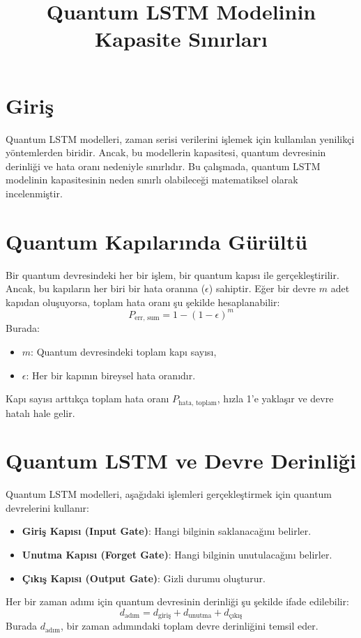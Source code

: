 \documentclass[a4paper,12pt]{article}
\title{Quantum LSTM Modelinin Kapasite Sınırları}
\author{}
\date{}
\begin{document}
\maketitle

\section*{Giriş}
Quantum LSTM modelleri, zaman serisi verilerini işlemek için kullanılan yenilikçi yöntemlerden biridir. Ancak, bu modellerin kapasitesi, quantum devresinin derinliği ve hata oranı nedeniyle sınırlıdır. Bu çalışmada, quantum LSTM modelinin kapasitesinin neden sınırlı olabileceği matematiksel olarak incelenmiştir.

\section*{Quantum Kapılarında Gürültü}
Bir quantum devresindeki her bir işlem, bir quantum kapısı ile gerçekleştirilir. Ancak, bu kapıların her biri bir hata oranına ($\epsilon$) sahiptir. Eğer bir devre $m$ adet kapıdan oluşuyorsa, toplam hata oranı şu şekilde hesaplanabilir:
\[
P_{\text{err, sum}} = 1 - (1 - \epsilon)^m
\]
Burada:
\begin{itemize}
    \item $m$: Quantum devresindeki toplam kapı sayısı,
    \item $\epsilon$: Her bir kapının bireysel hata oranıdır.
\end{itemize}
Kapı sayısı arttıkça toplam hata oranı $P_{\text{hata, toplam}}$, hızla 1'e yaklaşır ve devre hatalı hale gelir.

\section*{Quantum LSTM ve Devre Derinliği}
Quantum LSTM modelleri, aşağıdaki işlemleri gerçekleştirmek için quantum devrelerini kullanır:
\begin{itemize}
    \item \textbf{Giriş Kapısı (Input Gate)}: Hangi bilginin saklanacağını belirler.
    \item \textbf{Unutma Kapısı (Forget Gate)}: Hangi bilginin unutulacağını belirler.
    \item \textbf{Çıkış Kapısı (Output Gate)}: Gizli durumu oluşturur.
\end{itemize}

Her bir zaman adımı için quantum devresinin derinliği şu şekilde ifade edilebilir:
\[
d_{\text{adım}} = d_{\text{giriş}} + d_{\text{unutma}} + d_{\text{çıkış}}
\]
Burada $d_{\text{adım}}$, bir zaman adımındaki toplam devre derinliğini temsil eder.
\end{document}
